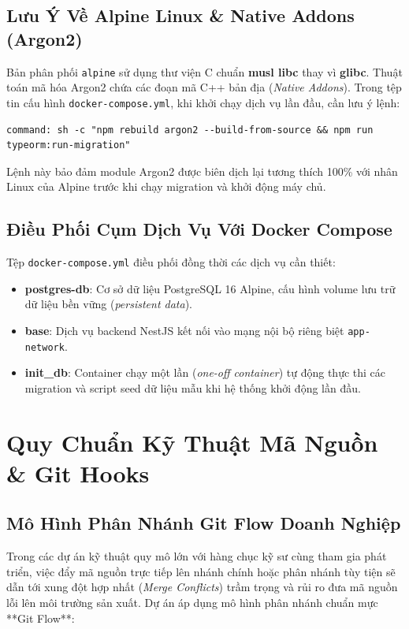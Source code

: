 \documentclass[12pt,a4paper,oneside]{book}
\begin{document}
\section{Lưu Ý Về Alpine Linux \& Native Addons (Argon2)}
Bản phân phối \texttt{alpine} sử dụng thư viện C chuẩn \textbf{musl libc} thay vì \textbf{glibc}. Thuật toán mã hóa Argon2 chứa các đoạn mã C++ bản địa (\textit{Native Addons}). Trong tệp tin cấu hình \texttt{docker-compose.yml}, khi khởi chạy dịch vụ lần đầu, cần lưu ý lệnh:
\begin{Verbatim}[fontsize=\small]
command: sh -c "npm rebuild argon2 --build-from-source && npm run typeorm:run-migration"
\end{Verbatim}
Lệnh này bảo đảm module Argon2 được biên dịch lại tương thích 100\% với nhân Linux của Alpine trước khi chạy migration và khởi động máy chủ.

\section{Điều Phối Cụm Dịch Vụ Với Docker Compose}
Tệp \texttt{docker-compose.yml} điều phối đồng thời các dịch vụ cần thiết:
\begin{itemize}
  \item \textbf{postgres-db}: Cơ sở dữ liệu PostgreSQL 16 Alpine, cấu hình volume lưu trữ dữ liệu bền vững (\textit{persistent data}).
  \item \textbf{base}: Dịch vụ backend NestJS kết nối vào mạng nội bộ riêng biệt \texttt{app-network}.
  \item \textbf{init\_db}: Container chạy một lần (\textit{one-off container}) tự động thực thi các migration và script seed dữ liệu mẫu khi hệ thống khởi động lần đầu.
\end{itemize}

\chapter{Quy Chuẩn Kỹ Thuật Mã Nguồn \& Git Hooks}

\section{Mô Hình Phân Nhánh Git Flow Doanh Nghiệp}
Trong các dự án kỹ thuật quy mô lớn với hàng chục kỹ sư cùng tham gia phát triển, việc đẩy mã nguồn trực tiếp lên nhánh chính hoặc phân nhánh tùy tiện sẽ dẫn tới xung đột hợp nhất (\textit{Merge Conflicts}) trầm trọng và rủi ro đưa mã nguồn lỗi lên môi trường sản xuất. Dự án áp dụng mô hình phân nhánh chuẩn mực **Git Flow**:
\end{document}
